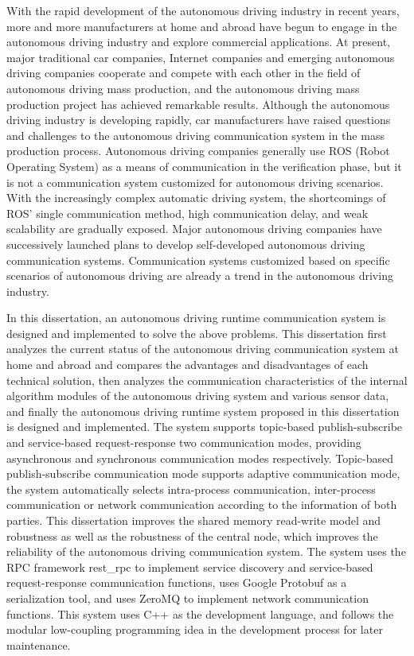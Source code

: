 \begin{abstract*}
  With the rapid development of the autonomous driving industry in recent years, 
  more and more manufacturers at home and abroad have begun to engage in the autonomous driving industry and explore commercial applications. 
  At present, major traditional car companies, 
  Internet companies and emerging autonomous driving companies cooperate and compete with each other in the field of autonomous driving mass production, 
  and the autonomous driving mass production project has achieved remarkable results. 
  Although the autonomous driving industry is developing rapidly, 
  car manufacturers have raised questions and challenges to the autonomous driving communication system in the mass production process. 
  Autonomous driving companies generally use ROS (Robot Operating System) as a means of communication in the verification phase, 
  but it is not a communication system customized for autonomous driving scenarios. 
  With the increasingly complex automatic driving system, 
  the shortcomings of ROS' single communication method, 
  high communication delay, and weak scalability are gradually exposed. 
  Major autonomous driving companies have successively launched plans to develop self-developed autonomous driving communication systems. 
  Communication systems customized based on specific scenarios of autonomous driving are already a trend in the autonomous driving industry.

  In this dissertation, an autonomous driving runtime communication system is designed and implemented to solve the above problems. 
  This dissertation first analyzes the current status of the autonomous driving communication system at home and abroad and compares the advantages and disadvantages of each technical solution, 
  then analyzes the communication characteristics of the internal algorithm modules of the autonomous driving system and various sensor data, 
  and finally the autonomous driving runtime system proposed in this dissertation is designed and implemented. 
  The system supports topic-based publish-subscribe and service-based request-response two communication modes, 
  providing asynchronous and synchronous communication modes respectively.
  Topic-based publish-subscribe communication mode supports adaptive communication mode, 
  the system automatically selects intra-process communication, 
  inter-process communication or network communication according to the information of both parties. 
  This dissertation improves the shared memory read-write model and robustness as well as the robustness of the central node, 
  which improves the reliability of the autonomous driving communication system. 
  The system uses the RPC framework rest\_rpc to implement service discovery and service-based request-response communication functions, 
  uses Google Protobuf as a serialization tool, and uses ZeroMQ to implement network communication functions. 
  This system uses C++ as the development language, 
  and follows the modular low-coupling programming idea in the development process for later maintenance.


\end{abstract*}
